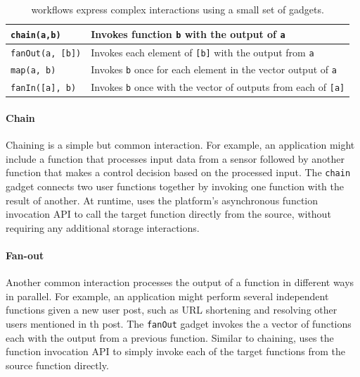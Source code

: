 \begin{table}[t!]
  \centering
  \begin{tabular}{ |m{8em}| m{13em} | }
    \hline
      \texttt{chain(a,b) }& Invokes function \texttt{b} with the output of \texttt{a} \\
    \hline
      \texttt{fanOut(a, [b])} & Invokes each element of \texttt{[b]} with the output from \texttt{a} \\
    \hline
      \texttt{map(a, b)} & Invokes \texttt{b} once for each element in the vector output of \texttt{a} \\
    \hline
      \texttt{fanIn([a], b)} & Invokes \texttt{b} once with the vector of outputs from each of \texttt{[a]} \\
    \hline
\end{tabular}
  \caption{\name{} workflows express complex interactions using a small set of gadgets.} 
  \label{tab:gadgets}
\end{table}

\paragraph{Chain}
Chaining is a simple but common interaction. For example, an application might
include a function that processes input data from a sensor followed by another
function that makes a control decision based on the processed input. The
\texttt{chain} gadget connects two user functions together by invoking one
function with the result of another. At runtime, \name{} uses the platform's
asynchronous function invocation API to call the target function directly from
the source, without requiring any additional storage interactions.


\paragraph{Fan-out}
Another common interaction processes the output of a function in different ways
in parallel. For example, an application might perform several independent
functions given a new user post, such as URL shortening and resolving other
users mentioned in th post. The \texttt{fanOut} gadget invokes the a vector of
functions each with the output from a previous function. Similar to chaining,
\name{} uses the function invocation API to simply invoke each of the target
functions from the source function directly. 

